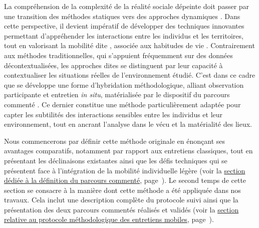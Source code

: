 \begin{refsegment}
La compréhension de la complexité de la réalité sociale dépeinte doit passer par une transition des méthodes statiques vers des approches dynamiques \textcolor{blue}{\textcite[207]{sheller_new_2006}}. Dans cette perspective, il devient impératif de développer des techniques innovantes permettant d’appréhender les interactions entre les individus et les territoires, tout en valorisant la mobilité dite , associée aux habitudes de vie \textcolor{blue}{\autocite[1~267-1~271]{hein_mobile_2008}}. Contrairement aux méthodes traditionnelles, qui s’appuient fréquemment sur des données décontextualisées, les approches dites  se distinguent par leur capacité à contextualiser les situations réelles de l’environnement étudié. C’est dans ce cadre que se développe une forme d’hybridation méthodologique, alliant observation participante et entretien \textit{in situ}, matérialisée par le dispositif du parcours commenté \textcolor{blue}{\autocites[84]{thibaud_methode_2001}[3, 5]{despres_replacer_2019}{meissonnier_methodological_2020}}. Ce dernier constitue une méthode particulièrement adaptée pour capter les subtilités des interactions sensibles entre les individus et leur environnement, tout en ancrant l’analyse dans le vécu et la matérialité des lieux.%

Nous commencerons par définir cette méthode originale en énonçant ses avantages comparatifs, notamment par rapport aux entretiens classiques, tout en présentant les déclinaisons existantes ainsi que les défis techniques qui se présentent face à l'intégration de la mobilité individuelle légère (voir la \hyperref[chap3:parcours-commente-definition]{section dédiée à la définition du parcours commenté}, page~\pageref{chap3:parcours-commente-definition}). Le second temps de cette section se consacre à la manière dont cette méthode a été appliquée dans nos travaux. Cela inclut une description complète du protocole suivi ainsi que la présentation des deux parcours commentés réalisés et validés (voir la \hyperref[chap3:parcours-commente-administration]{section relative au protocole méthodologique des entretiens mobiles}, page~\pageref{chap3:parcours-commente-administration}).%


\end{refsegment}
